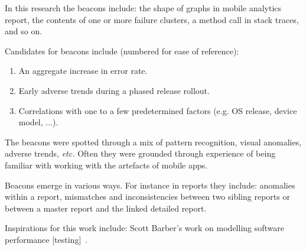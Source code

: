 
In this research the beacons include: the shape of graphs in mobile analytics report, the contents of one or more failure clusters, a method call in stack traces, and so on.

Candidates for beacons include (numbered for ease of reference):
\begin{enumerate}
    \item An aggregate increase in error rate.
    \item Early adverse trends during a phased release rollout.
    \item Correlations with one to a few predetermined factors (e.g. OS release, device model, ...).
\end{enumerate}


The beacons were spotted through a mix of pattern recognition, visual anomalies, adverse trends, \emph{etc.} Often they were grounded through experience of being familiar with working with the artefacts of mobile apps.

Beacons emerge in various ways. For instance in reports they include: anomalies within a report, mismatches and inconsistencies between two sibling reports or between a master report and the linked detailed report.

Inspirations for this work include: Scott Barber's work on modelling software performance [testing]~.

